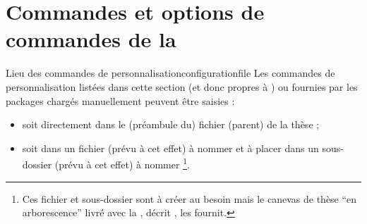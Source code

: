 %
%
%
%

\section{Commandes et options de commandes de la \yatCl{}}
%
%

\begin{dbremark}{Lieu des commandes de personnalisation}{configurationfile}
  Les commandes de personnalisation listées dans cette section (et donc propres
  à \yatCl{}) ou fournies par les packages chargés manuellement peuvent être
  saisies :
  \begin{itemize}
  \item soit directement dans le (préambule du) fichier (parent) de la thèse ;
  \item%
    soit dans un fichier (prévu à cet effet) à nommer \file{\configurationfile}
    et à placer dans un sous-dossier (prévu à cet effet) à nommer
    \folder{\configurationdirectory}\footnote{Ces fichier et sous-dossier sont
      à créer au besoin mais le canevas de thèse \enquote{en arborescence} livré
      avec la \yatCl{}, décrit , les fournit.}.
  \end{itemize}
\end{dbremark}

